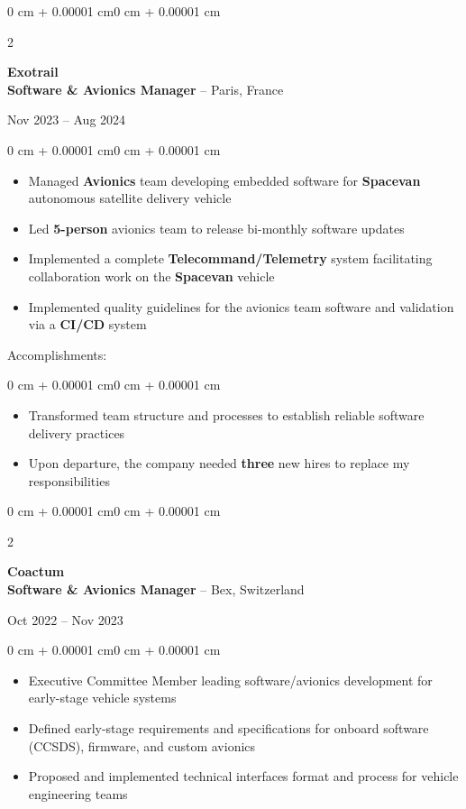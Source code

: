 \documentclass[10pt, letterpaper]{article}
\newenvironment{highlights}{
    \begin{itemize}[
        topsep=0.10 cm,
        parsep=0.10 cm,
        partopsep=0pt,
        itemsep=0pt,
        leftmargin=1.5 cm
    ]
}{
    \end{itemize}
}
\newenvironment{highlightsforbulletentries}{
    \begin{itemize}[
        topsep=0.10 cm,
        parsep=0.10 cm,
        partopsep=0pt,
        itemsep=0pt,
        leftmargin=1.5 cm
    ]
}{
    \end{itemize}
}
\newenvironment{onecolentry}{
    \begin{adjustwidth}{0 cm + 0.00001 cm}{0 cm + 0.00001 cm}
}{
    \end{adjustwidth}
}
\newenvironment{twocolentry}[2][]{
    \onecolentry
    \def\secondColumn{#2}
    \setcolumnwidth{\fill, 4.5 cm}
    \begin{paracol}{2}
}{
    \switchcolumn \raggedleft \secondColumn
    \end{paracol}
    \endonecolentry
}
\begin{document}
    \begin{twocolentry}{Nov 2023 -- Aug 2024}
        \textbf{Exotrail} \\
        \textbf{Software \& Avionics Manager} -- Paris, France
    \end{twocolentry}
    \begin{onecolentry}
        \begin{highlights}
            \item Managed \textbf{Avionics} team developing embedded software for \textbf{Spacevan} autonomous satellite delivery vehicle
            \item Led \textbf{5-person} avionics team to release bi-monthly software updates
            \item Implemented a complete \textbf{Telecommand/Telemetry} system facilitating collaboration work on the \textbf{Spacevan} vehicle
            \item Implemented quality guidelines for the avionics team software and validation via a \textbf{CI/CD} system
        \end{highlights}
    \end{onecolentry}

    Accomplishments:
    \begin{onecolentry}
        \begin{highlightsforbulletentries}
            \item Transformed team structure and processes to establish reliable software delivery practices
            \item Upon departure, the company needed \textbf{three} new hires to replace my responsibilities
        \end{highlightsforbulletentries}
    \end{onecolentry}

    \vspace{0.5cm}

    \begin{twocolentry}{Oct 2022 -- Nov 2023}
        \textbf{Coactum} \\
        \textbf{Software \& Avionics Manager} -- Bex, Switzerland
    \end{twocolentry}
    \begin{onecolentry}
        \begin{highlights}
            \item Executive Committee Member leading software/avionics development for early-stage vehicle systems
            \item Defined early-stage requirements and specifications for onboard software (CCSDS), firmware, and custom avionics
            \item Proposed and implemented technical interfaces format and process for vehicle engineering teams
        \end{highlights}
    \end{onecolentry}
\end{document}
